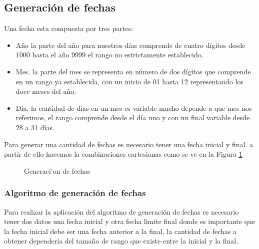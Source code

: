 \subsection{Generaci\'on de fechas}
Una fecha esta compuesta por tres partes:
\begin{itemize}
\item A\~no la parte del a\~no para nuestros d\'ias comprende de cuatro d\'igitos desde 1000 hasta el a\~no 9999 el rango no estrictamente establecido.
\item
Mes. la parte del mes se representa en n\'umero de dos d\'igitos que comprende en un rango ya establecida, con un inicio de 01 hasta 12 representando los doce meses del a\~no.
\item
 D\'ia. la cantidad de d\'ias en un mes es variable mucho depende a que mes nos referimos, el rango comprende desde el d\'ia uno y con un final variable desde 28 a 31 d\'ias.
\end{itemize}
Para generar una cantidad de fechas es necesario tener una fecha inicial y final. a partir de ello hacemos la combinaciones cartesianas como se ve en la Figura \ref{fig:generacion de fechas}
\begin{figure}[H]
\centering
{}
\caption{Generaci'on de fechas} \label{fig:generacion de fechas}
\end{figure}
\subsubsection{Algoritmo de generaci\'on de fechas}
Para realizar la aplicaci\'on del algoritmo de generaci\'on de fechas es necesario tener dos datos una fecha inicial y otra fecha limite final donde es importante que la fecha inicial debe ser una fecha anterior a la final, la cantidad de fechas a obtener depender\'ia del tama\~no de rango que existe entre la inicial y la final.

